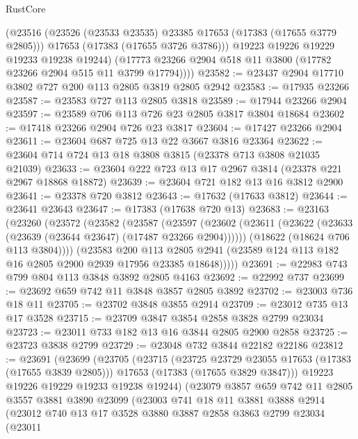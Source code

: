 \begin{lexlean}{RustCore}
\begin{coremodule}
          (@23516
            (@23526 (@23533 @23535) @23385 @17653 (@17383 (@17655 @3779 @2805)))
            @17653
            (@17383 (@17655 @3726 @3786)))
          @19223
          @19226
          @19229
          @19233
          @19238
          @19244)
        (@17773 @23266 @2904 @518 @11 @3800 (@17782 @23266 @2904 @515 @11 @3799 @17794))))
@23582 := @23437 @2904 @17710 @3802 @727 @200 @113 @2805 @3819 @2805 @2942
@23583 := @17935 @23266
@23587 := @23583 @727 @113 @2805 @3818
@23589 := @17944 @23266 @2904
@23597 := @23589 @706 @113 @726 @23 @2805 @3817 @3804 @18684
@23602 := @17418 @23266 @2904 @726 @23 @3817
@23604 := @17427 @23266 @2904
@23611 := @23604 @687 @725 @13 @22 @3667 @3816 @23364
@23622 := @23604 @714 @724 @13 @18 @3808 @3815 (@23378 @713 @3808 @21035 @21039)
@23633 := @23604 @222 @723 @13 @17 @2967 @3814 (@23378 @221 @2967 @18868 @18872)
@23639 := @23604 @721 @182 @13 @16 @3812 @2900
@23641 := @23378 @720 @3812
@23643 := @17632 (@17633 @3812)
@23644 := @23641 @23643
@23647 := @17383 (@17638 @720 @13)
@23683 := @23163
    (@23260
      (@23572
        (@23582
          (@23587
            (@23597
              (@23602 (@23611 (@23622 (@23633 (@23639 (@23644 @23647) (@17487 @23266 @2904))))))
              (@18622 (@18624 @706 @113 @3804))))
          (@23583
            @200
            @113
            @2805
            @2941
            (@23589 @124 @113 @182 @16 @2805 @2900 @2939 @17956 @23385 @18648)))))
@23691 := @22983 @743 @799 @804 @113 @3848 @3892 @2805 @4163
@23692 := @22992 @737
@23699 := @23692 @659 @742 @11 @3848 @3857 @2805 @3892
@23702 := @23003 @736 @18 @11
@23705 := @23702 @3848 @3855 @2914
@23709 := @23012 @735 @13 @17 @3528
@23715 := @23709 @3847 @3854 @2858 @3828 @2799 @23034
@23723 := @23011 @733 @182 @13 @16 @3844 @2805 @2900 @2858
@23725 := @23723 @3838 @2799
@23729 := @23048 @732 @3844 @22182 @22186
@23812 := @23691
    (@23699
      (@23705
        (@23715
          (@23725 @23729 @23055 @17653 (@17383 (@17655 @3839 @2805)))
          @17653
          (@17383 (@17655 @3829 @3847)))
        @19223
        @19226
        @19229
        @19233
        @19238
        @19244)
      (@23079
        @3857
        @659
        @742
        @11
        @2805
        @3557
        @3881
        @3890
        @23099
        (@23003
          @741
          @18
          @11
          @3881
          @3888
          @2914
          (@23012
            @740
            @13
            @17
            @3528
            @3880
            @3887
            @2858
            @3863
            @2799
            @23034
            (@23011

\end{coremodule}
\end{lexlean}
